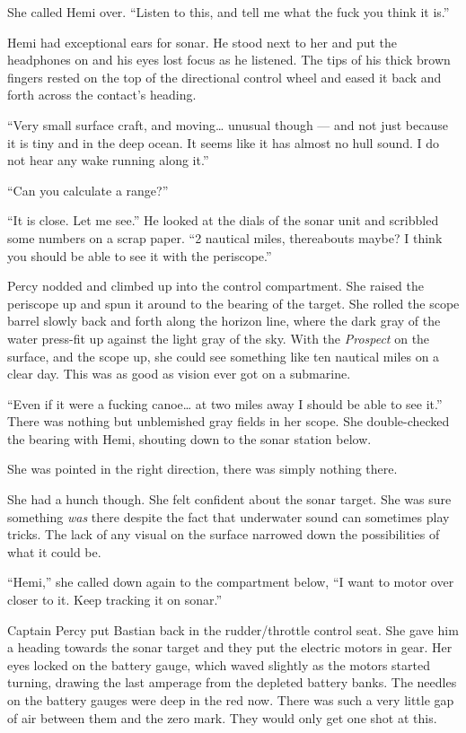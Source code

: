 \documentclass[]{scrbook}
\begin{document}
She called Hemi over. ``Listen to this, and tell me what the fuck you
think it is.''

Hemi had exceptional ears for sonar. He stood next to her and put the
headphones on and his eyes lost focus as he listened. The tips of his
thick brown fingers rested on the top of the directional control wheel
and eased it back and forth across the contact's heading.

``Very small surface craft, and moving\ldots{} unusual though --- and
not just because it is tiny and in the deep ocean. It seems like it has
almost no hull sound. I do not hear any wake running along it.''

``Can you calculate a range?''

``It is close. Let me see.'' He looked at the dials of the sonar unit
and scribbled some numbers on a scrap paper. ``2 nautical miles,
thereabouts maybe? I think you should be able to see it with the
periscope.''

Percy nodded and climbed up into the control compartment. She raised the
periscope up and spun it around to the bearing of the target. She rolled
the scope barrel slowly back and forth along the horizon line, where the
dark gray of the water press-fit up against the light gray of the sky.
With the \emph{Prospect} on the surface, and the scope up, she could see
something like ten nautical miles on a clear day. This was as good as
vision ever got on a submarine.

``Even if it were a fucking canoe\ldots{} at two miles away I should be
able to see it.'' There was nothing but unblemished gray fields in her
scope. She double-checked the bearing with Hemi, shouting down to the
sonar station below.

She was pointed in the right direction, there was simply nothing there.

She had a hunch though. She felt confident about the sonar target. She
was sure something \emph{was} there despite the fact that underwater
sound can sometimes play tricks. The lack of any visual on the surface
narrowed down the possibilities of what it could be.

``Hemi,'' she called down again to the compartment below, ``I want to
motor over closer to it. Keep tracking it on sonar.''

Captain Percy put Bastian back in the rudder/throttle control seat. She
gave him a heading towards the sonar target and they put the electric
motors in gear. Her eyes locked on the battery gauge, which waved
slightly as the motors started turning, drawing the last amperage from
the depleted battery banks. The needles on the battery gauges were deep
in the red now. There was such a very little gap of air between them and
the zero mark. They would only get one shot at this.
\end{document}
